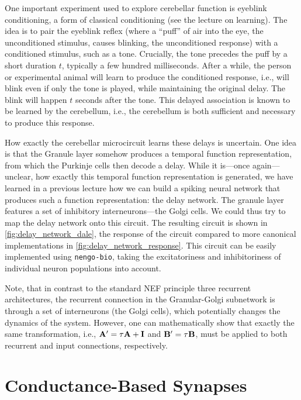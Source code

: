 \documentclass[10pt,letterpaper,oneside]{article}
\begin{document}
One important experiment used to explore cerebellar function is eyeblink conditioning, a form of classical conditioning (see the lecture on learning). The idea is to pair the eyeblink reflex (where a \enquote{puff} of air into the eye, the unconditioned stimulus, causes blinking, the unconditioned response) with a conditioned stimulus, such as a tone. Crucially, the tone precedes the puff by a short duration $t$, typically a few hundred milliseconds. After a while, the person or experimental animal will learn to produce the conditioned response, i.e., will blink even if only the tone is played, while maintaining the original delay. The blink will happen $t$ seconds after the tone. This delayed association is known to be learned by the cerebellum, i.e., the cerebellum is both sufficient and necessary to produce this response.

How exactly the cerebellar microcircuit learns these delays is uncertain. One idea is that the Granule layer somehow produces a temporal function representation, from which the Purkinje cells then decode a delay. While it is---once again---unclear, how exactly this temporal function representation is generated, we have learned in a previous lecture how we can build a spiking neural network that produces such a function representation: the delay network. The granule layer features a set of inhibitory interneurons---the Golgi cells. We could thus try to map the delay network onto this circuit. The resulting circuit is shown in \cref{fig:delay_network_dale}, the response of the circuit compared to more canonical implementations in \cref{fig:delay_network_response}. This circuit can be easily implemented using \texttt{nengo-bio}, taking the excitatoriness and inhibitoriness of individual neuron populations into account.

Note, that in contrast to the standard NEF principle three recurrent architectures, the recurrent connection in the Granular-Golgi subnetwork is through a set of interneurons (the Golgi cells), which potentially changes the dynamics of the system. However, one can mathematically show that exactly the same transformation, i.e., ${\mathbf{A}}' = \tau {\mathbf{A}} + {\mathbf{I}}$ and ${\mathbf{B}}' = \tau {\mathbf{B}}$, must be applied to both recurrent and input connections, respectively.

\section{Conductance-Based Synapses}
\end{document}
